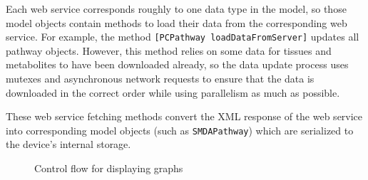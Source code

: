 Each web service corresponds roughly to one data type in the model, so those
model objects contain methods to load their data from the corresponding web
service. For example, the method \texttt{[PCPathway loadDataFromServer]}
updates all pathway objects. However, this method relies on some data for
tissues and metabolites to have been downloaded already, so the data update
process uses mutexes and asynchronous network requests to ensure that the data
is downloaded in the correct order while using parallelism as much as possible.

These web service fetching methods convert the XML response of the web service
into corresponding model objects (such as \texttt{SMDAPathway}) which are
serialized to the device's internal storage.

\begin{figure}[htbp]
    \caption{\label{fig:maw_controlflow} Control flow for displaying graphs}
\end{figure}

